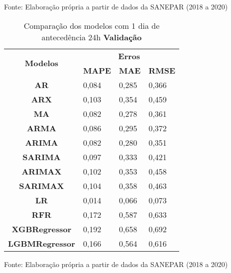 \begin{table}[H]
Fonte: Elaboração própria a partir de dados da SANEPAR (2018 a 2020)
\end{table}

\begin{table}[H]
	\centering
	\caption{Comparação dos modelos com 1 dia de antecedência 24h \textbf{Validação} }\label{tb:1-24vld}
	\begin{tabular}{@{}clll@{}}
		\toprule
		\multirow{2}{*}{\textbf{Modelos}} & \multicolumn{3}{c}{\textbf{Erros}}                                                                       \\ \cmidrule(l){2-4} 
		& \multicolumn{1}{c}{\textbf{MAPE}} & \multicolumn{1}{c}{\textbf{MAE}} & \multicolumn{1}{c}{\textbf{RMSE}} \\ \hline
\textbf{AR}                       & 0,084                             & 0,285                            & 0,366                             \\
\textbf{ARX}                      & 0,103                             & 0,354                            & 0,459                             \\
\textbf{MA}                       & 0,082                             & 0,278                            & 0,361                             \\
\textbf{ARMA}                     & 0,086                             & 0,295                            & 0,372                             \\
\textbf{ARIMA}                    & 0,082                             & 0,280                            & 0,351                             \\
\textbf{SARIMA}                   & 0,097                             & 0,333                            & 0,421                             \\
\textbf{ARIMAX}                   & 0,102                             & 0,353                            & 0,458                             \\
\textbf{SARIMAX}                  & 0,104                             & 0,358                            & 0,463                             \\
\textbf{LR}                       & 0,014                             & 0,066                            & 0,073                             \\
\textbf{RFR}                      & 0,172                             & 0,587                            & 0,633                             \\
\textbf{XGBRegressor}             & 0,192                             & 0,658                            & 0,692                             \\
\textbf{LGBMRegressor}            & 0,166                             & 0,564                            & 0,616                             \\ \bottomrule
	\end{tabular}

Fonte: Elaboração própria a partir de dados da SANEPAR (2018 a 2020)
\end{table}

